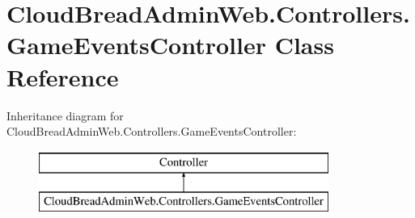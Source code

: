 \hypertarget{a00084}{}\section{Cloud\+Bread\+Admin\+Web.\+Controllers.\+Game\+Events\+Controller Class Reference}
\label{a00084}
Inheritance diagram for Cloud\+Bread\+Admin\+Web.\+Controllers.\+Game\+Events\+Controller\+:\begin{figure}[H]
\begin{center}
\leavevmode
\includegraphics[height=2.000000cm]{a00084}
\end{center}
\end{figure}

